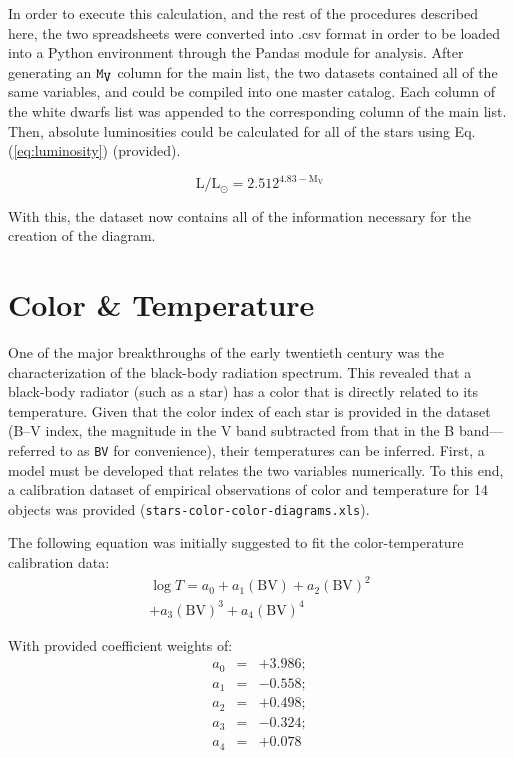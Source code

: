 \documentclass[twocolumn]{aastex63}
\begin{document}
In order to execute this calculation, and the rest of the procedures described here, the two spreadsheets were converted into .csv format in order to be loaded into a Python environment through the Pandas module for analysis. After generating an ${\verb|M|}_{\verb|V|}$ column for the main list, the two datasets contained all of the same variables, and could be compiled into one master catalog. Each column of the white dwarfs list was appended to the corresponding column of the main list. Then, absolute luminosities could be calculated for all of the stars using Eq. (\ref{eq:luminosity}) (provided).

\begin{equation} \label{eq:luminosity}
    \text{L}/\text{L}_\odot = 2.512^{4.83-\text{M}_{\text{V}}}
\end{equation}

With this, the dataset now contains all of the information necessary for the creation of the diagram.

\section{Color \& Temperature} \label{sec:colortemp}

One of the major breakthroughs of the early twentieth century was the characterization of the black-body radiation spectrum. This revealed that a black-body radiator (such as a star) has a color that is directly related to its temperature. Given that the color index of each star is provided in the dataset (B--V index, the magnitude in the V band subtracted from that in the B band---referred to as \verb|BV| for convenience), their temperatures can be inferred. First, a model must be developed that relates the two variables numerically. To this end, a calibration dataset of empirical observations of color and temperature for 14 objects was provided (\verb|stars-color-color-diagrams.xls|).

The following equation was initially suggested to fit the color-temperature calibration data:
\begin{eqnarray} \label{eq:a-poly}
  \log{T} = a_0 + a_1(\text{BV}) + a_2(\text{BV})^2 \nonumber\\ + a_3(\text{BV})^3 + a_4(\text{BV})^4
\end{eqnarray}

\newpage

With provided coefficient weights of:
\begin{eqnarray*}
a_0 &=& +3.986; \\ a_1 &=& -0.558; \\ a_2 &=& +0.498; \\ a_3 &=& -0.324; \\ a_4 &=& +0.078
\end{eqnarray*}
\end{document}
